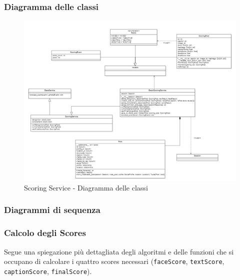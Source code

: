 \subsubsection{Diagramma delle classi}
\begin{figure}[!h]
    \includegraphics[width=15cm]{sezioni/images/cd_scoring.png}
    \caption{Scoring Service - Diagramma delle classi}
\end{figure}
\subsubsection{Diagrammi di sequenza}
\subsubsection{Calcolo degli Scores}
Segue una spiegazione più dettagliata degli algoritmi e delle funzioni che si occupano di calcolare
i quattro scores necessari (\verb+faceScore+, \verb+textScore+, \verb+captionScore+, \verb+finalScore+).

